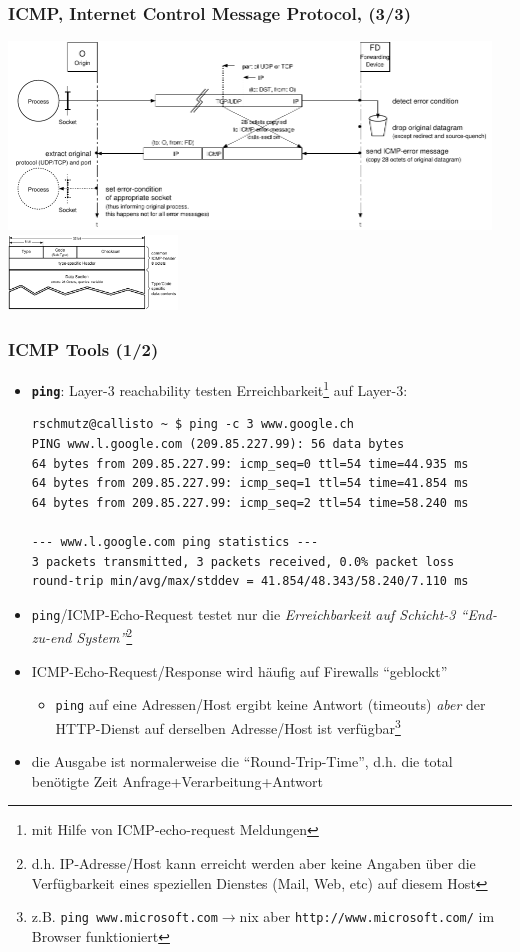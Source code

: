 \documentclass{beamer}
\begin{document}
\begin{frame}
\frametitle{ICMP, Internet Control Message Protocol, (3/3)}
{\center \includegraphics[height=5cm]{icmp-errormessage}} \\
{\center \includegraphics[height=2cm]{icmp-packetformat}}
\end{frame}

\begin{frame}[fragile]
\frametitle{ICMP Tools (1/2)}
\begin{itemize}
	\item{\textbf{\texttt{ping}}: Layer-3 reachability} testen Erreichbarkeit\footnote{mit Hilfe von ICMP-echo-request Meldungen} auf Layer-3:
		\begin{tiny}
		\begin{verbatim}
rschmutz@callisto ~ $ ping -c 3 www.google.ch
PING www.l.google.com (209.85.227.99): 56 data bytes
64 bytes from 209.85.227.99: icmp_seq=0 ttl=54 time=44.935 ms
64 bytes from 209.85.227.99: icmp_seq=1 ttl=54 time=41.854 ms
64 bytes from 209.85.227.99: icmp_seq=2 ttl=54 time=58.240 ms

--- www.l.google.com ping statistics ---
3 packets transmitted, 3 packets received, 0.0% packet loss
round-trip min/avg/max/stddev = 41.854/48.343/58.240/7.110 ms
\end{verbatim}
\end{tiny}
\item{\texttt{ping}/ICMP-Echo-Request testet nur die \emph{Erreichbarkeit auf Schicht-3 ``End-zu-end System''}\footnote{d.h. IP-Adresse/Host kann erreicht werden aber keine Angaben \"uber die Verf\"ugbarkeit eines speziellen Dienstes (Mail, Web, etc) auf diesem Host}}
\item{ICMP-Echo-Request/Response wird h\"aufig auf Firewalls ``geblockt''
  \begin{itemize}
    \item{\texttt{ping} auf eine Adressen/Host ergibt keine Antwort (timeouts) \emph{aber} der HTTP-Dienst auf derselben Adresse/Host ist verf\"ugbar\footnote{z.B. \texttt{ping www.microsoft.com}$\rightarrow$nix aber \texttt{http://www.microsoft.com/} im Browser funktioniert}}
  \end{itemize}
}
\item{die Ausgabe ist normalerweise die ``Round-Trip-Time'', d.h. die total ben\"otigte Zeit Anfrage+Verarbeitung+Antwort}
\end{itemize}
\end{frame}
\end{document}
